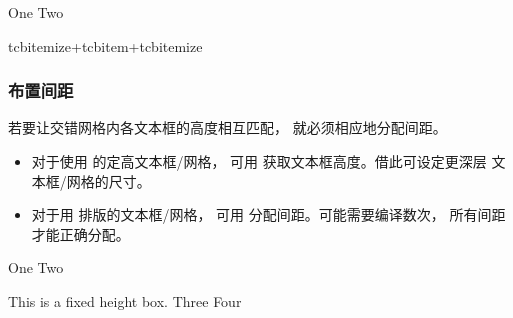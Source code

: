 \begin{dispExample}
\begin{tcbitemize}[raster equal height=rows,
  raster every box/.style={colframe=red!50!black,colback=red!10!white}]
  \tcbitem[blankest]
    \begin{tcbitemize}[raster columns=1]
      \tcbitem One
      \tcbitem Two
    \end{tcbitemize}
  \tcbitem tcbitemize+tcbitem+tcbitemize
\end{tcbitemize}
\end{dispExample}


\subsubsection{布置间距}
若要让交错网格内各文本框的高度相互匹配，
就必须相应地分配间距。

\begin{itemize}
\item 对于使用  的定高文本框/网格，
  可用  获取文本框高度。借此可设定更深层
  文本框/网格的尺寸。
\item 对于用  排版的文本框/网格，
  可用  分配间距。可能需要编译数次，
  所有间距才能正确分配。
\end{itemize}


\begin{dispExample}
\begin{tcbitemize}[raster rows=2,raster height=6cm,
  raster every box/.style={colframe=red!50!black,colback=red!10!white}]
  \tcbitem[blankest]
    \begin{tcbitemize}[raster columns=1,raster rows=2,raster height=\tcbtextheight]
      \tcbitem One
      \tcbitem Two
    \end{tcbitemize}
  \tcbitem This is a fixed height box.
  \tcbitem Three
  \tcbitem Four
\end{tcbitemize}
\end{dispExample}


